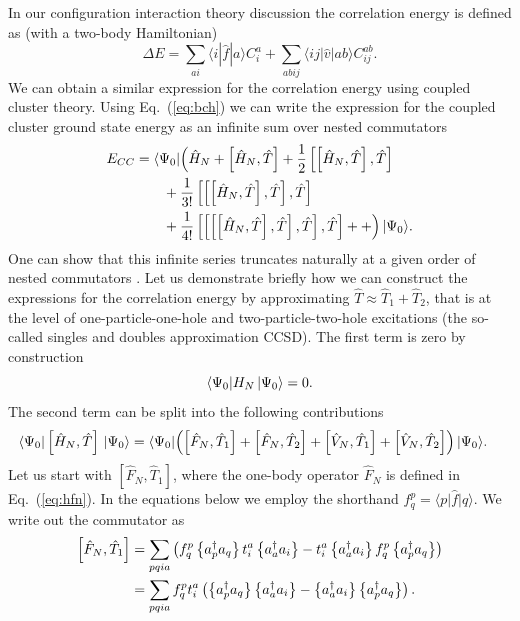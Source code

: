   In our configuration interaction theory discussion the correlation energy is defined as (with a two-body Hamiltonian) 
  \[
  \Delta E=\sum_{ai}\langle i| \hat{f}|a \rangle C_{i}^{a}+
  \sum_{abij}\langle ij | \hat{v}| ab \rangle C_{ij}^{ab}.
  \]
We can obtain a similar expression for the correlation energy using coupled cluster theory. 
Using Eq.~(\ref{eq:bch}) we can write the expression for the coupled cluster  ground state energy as an infinite sum over nested commutators
        \begin{align*}
            E_{CC} &= \langle \Psi_0|\Bigl( \hat{H}_N + \left[ \hat{H}_N, \hat{T} \right] +
                \frac{1}{2} \left[\left[ \hat{H}_N, \hat{T} \right], \hat{T}\right] \\
                & \qquad + \frac{1}{3!} \left[ \left[\left[ \hat{H}_N, \hat{T} \right], \hat{T}\right], \hat{T} \right] \\
                & \qquad + \frac{1}{4!} \left[ \left[ \left[\left[ \hat{H}_N, \hat{T} \right], \hat{T}\right], \hat{T} \right], \hat{T} \right] ++ \Bigr) \,|{\Psi_0}\rangle. \\
        \end{align*}
One can show that this infinite series truncates naturally at a given order of nested commutators \cite{shavittbartlett2009}. 
Let us demonstrate briefly how we can construct the expressions for the correlation 
energy by approximating $\hat{T}\approx \hat{T}_1+\hat{T}_2$, that is at the level of
one-particle-one-hole and two-particle-two-hole excitations (the so-called singles and doubles approximation CCSD).
        The first term is zero by construction
        \begin{equation*}
            \langle \Psi_0| H_N \,|{\Psi_0}\rangle = 0.
        \end{equation*}       
     The second term can be split into the following contributions
        \begin{align*}
        \langle \Psi_0|\left[ \hat{H}_N, \hat{T} \right]\,|{\Psi_0}\rangle & = 
            \langle \Psi_0| \Bigl(\left[ \hat{F}_N, \hat{T}_1 \right] + \left[ \hat{F}_N, \hat{T}_2 \right]
            + \left[ \hat{V}_N, \hat{T}_1 \right] + \left[ \hat{V}_N, \hat{T}_2 \right] \Bigr) \,|{\Psi_0}\rangle.
    \end{align*}
Let us start with $\left[ \hat{F}_N, \hat{T}_1 \right]$, where the one-body operator $\hat{F}_N$ is defined in Eq.~(\ref{eq:hfn}). 
In the equations below we employ the shorthand $f^p_q = \langle p\vert \hat{f} \vert q\rangle$.  
We write out the commutator  as
    \begin{align*}
        \left[ \hat{F}_N, \hat{T}_1 \right] &= \sum_{pqia} \left(f_q^p \left\{a_p^\dagger a_q\right\} 
            t_i^a \left\{a_a^\dagger a_i\right\} - t_i^a \left\{a_a^\dagger a_i\right\} f_q^p \left\{a_p^\dagger a_q\right\} \right) \\
        &= \sum_{pqia} f_q^p t_i^a \left( \left\{a_p^\dagger a_q\right\} \left\{a_a^\dagger a_i\right\} -
                \left\{a_a^\dagger a_i\right\} \left\{a_p^\dagger a_q\right\} \right).
    \end{align*}
